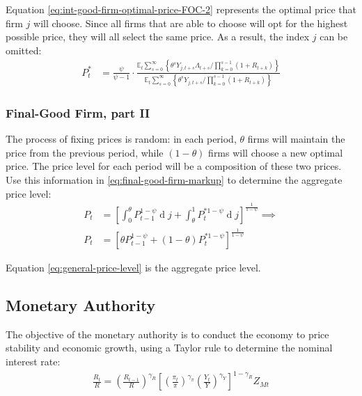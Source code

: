\documentclass[
	12pt,
	]{article}
\numberwithin{equation}{section}
\DeclareMathOperator{\dif}{d}
\newcommand{\E}[1][t]{{\mathbb{E}_{#1}}}
\theoremstyle{definition}
\theoremstyle{plain}
\theoremstyle{plain}
\theoremstyle{plain}
\begin{document}

Equation \ref{eq:int-good-firm-optimal-price-FOC-2} represents the optimal price that firm $j$ will choose. Since all firms that are able to choose will opt for the highest possible price, they will all select the same price. As a result, the index $j$ can be omitted:
\begin{align}
\label{eq:int-good-firm-optimal-price-FOC-3}
	P_t^\ast &= 
\frac{\psi}{\psi-1} \cdot
\frac{
	\E \sum_{s=0}^{\infty} \left\{ 
	\theta^s Y_{j,t+s} \Lambda_{t+s} / \prod_{k=0}^{s-1}(1+R_{t+k}) \right\} } {\E \sum_{s=0}^{\infty} \left\{
	\theta^s Y_{j,t+s} / \prod_{k=0}^{s-1}(1+R_{t+k}) \right\}}
\end{align}


\subsubsection{Final-Good Firm, part II}

The process of fixing prices is random: in each period, $\theta$ firms will maintain the price from the previous period, while $(1-\theta)$ firms will choose a new optimal price. The price level for each period will be a composition of these two prices. Use this information in \ref{eq:final-good-firm-markup} to determine the aggregate price level:
\begin{align}
	P_t & = \left[ \int_{0}^{\theta} P_{t-1}^{1-\psi} \dif j + \int_{\theta}^{1} P_t^{\ast 1-\psi} \dif j \right]^{\frac{1}{1-\psi}}  \implies \nonumber \\
	P_t & = \left[ \theta P_{t-1}^{1-\psi} + (1-\theta) P_t^{\ast 1-\psi} \right]^\frac{1}{1-\psi} \label{eq:general-price-level}
\end{align}

Equation \ref{eq:general-price-level} is the aggregate price level.


\subsection{Monetary Authority}

The objective of the monetary authority is to conduct the economy to price stability and economic growth, using a Taylor rule \cite{taylor_discretion_1993} to determine the nominal interest rate:
\begin{align}
\label{eq:monetary-policy}
	\frac{R_t}{R} =
	\left( \frac{R_{t-1}}{R} \right)^{\gamma_R}  \left[
	\left( \frac{\pi_t}{\pi} \right)^{\gamma_\pi}
	\left( \frac{Y_t}{Y} \right)^{\gamma_Y} \right]^{1-\gamma_R} Z_{Mt}
\end{align}
\end{document}
